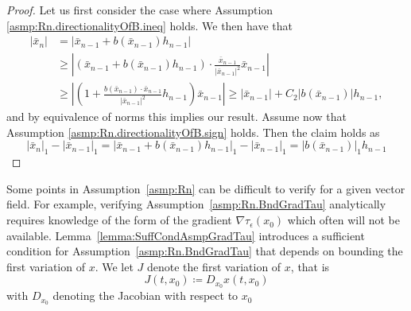 \documentclass[a4paper, oneside, reqno]{amsart}
\newcommand{\abs}[1]{\left\lvert#1\right\rvert}
\theoremstyle{remark}
\begin{document}
\begin{proof}
    Let us first consider the case where Assumption \ref{asmp:Rn.directionalityOfB.ineq} holds. We then have that
    \begin{align*}
        \abs{\bar x_{n}} &= \abs{\bar x_{n-1} + b(\bar x_{n-1})h_{n-1}} \\
        &\geq \abs{(\bar x_{n-1} + b(\bar x_{n-1})h_{n-1})\cdot\frac{\bar x_{n-1}}{\abs{\bar x_{n-1}}^2}\bar x_{n-1}}\\
        &\geq \abs{\left(1 + \frac{b(\bar x_{n-1})\cdot \bar x_{n-1}}{\abs{\bar x_{n-1}}^2}h_{n-1}\right)\bar x_{n-1}} \geq \abs{\bar x_{n-1}} + C_2\abs{b(\bar x_{n-1})}h_{n-1},
    \end{align*}
    and by equivalence of norms this implies our result. Assume now that Assumption \ref{asmp:Rn.directionalityOfB.sign} holds. Then the claim holds as
    \[\abs{\bar x_n}_1 - \abs{\bar x_{n-1}}_1 = \abs{\bar x_{n-1} + b(\bar x_{n-1})h_{n-1}}_1 - \abs{\bar x_{n-1}}_1 = \abs{b(\bar x_{n-1})}_1 h_{n-1}\]
\end{proof}

Some points in Assumption~\ref{asmp:Rn} can be difficult to verify for a given vector 
field. 
For example, verifying Assumption~\ref{asmp:Rn.BndGradTau} analytically requires knowledge of the form of the gradient \(\nabla\tau_\epsilon(x_0)\) which often will not be available. Lemma~\ref{lemma:SuffCondAsmpGradTau} introduces a sufficient condition for Assumption~\ref{asmp:Rn.BndGradTau} that depends on bounding the first variation of \(x\). We let \(J\) denote the first variation of \(x\), that is
    \[J(t, x_0) \coloneq D_{x_0} x(t, x_0)\]
    with \(D_{x_0}\) denoting the Jacobian with respect to \(x_0\)
    
\end{document}
